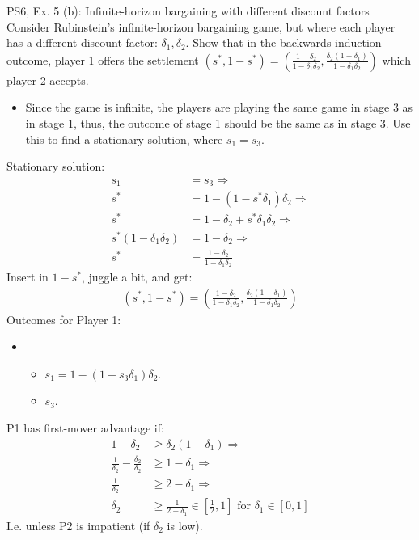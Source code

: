\begin{frame}{PS6, Ex. 5 (b): Infinite-horizon bargaining with different discount factors}
    Consider Rubinstein's infinite-horizon bargaining game, but where each player has a different discount factor: $\delta_1,\delta_2$. Show that in the backwards induction outcome, player 1 offers the settlement
    $(s^{*},1-s^{*})=\left( \frac{1-\delta_2}{1-\delta_1\delta_2},\frac{\delta_2(1-\delta_1)}{1-\delta_1\delta_2}\right)$
    which player 2 accepts.
    \begin{itemize}
      \item[(Step b)] Since the game is infinite, the players are playing the same game in stage 3 as in stage 1, thus, the outcome of stage 1 should be the same as in stage 3. Use this to find a stationary solution, where $s_{1}=s_{3}$.
    \end{itemize}
  \begin{multicols}{2}
    Stationary solution:
    \begin{align*}
          s_1&= s_3 \Rightarrow\\
        s^{*}&= 1- (1-s^{*}\delta_1)\delta_2 \Rightarrow\\
        s^{*}&= 1-\delta_2+s^{*}\delta_1\delta_2 \Rightarrow\\
        s^{*}(1-\delta_1\delta_2)&= 1-\delta_2 \Rightarrow\\
        s^{*}&= \frac{1-\delta_2}{1-\delta_1\delta_2}
    \end{align*}
    Insert in $1-s^{*}$, juggle a bit, and get:
    \begin{align*}
        (s^{*},1-s^{*})= \left( \frac{1-\delta_2}{1-\delta_1\delta_2},\frac{\delta_2(1-\delta_1)}{1-\delta_1\delta_2}\right)
    \end{align*}
    \vfill\null \columnbreak
    Outcomes for Player 1:
    \begin{itemize}
        \item[]\vspace{-8pt}
            \begin{itemize}\normalsize
            \item[Stage 1:] $s_1 = 1-(1-s_3\delta_1)\delta_2$.
            \item[Stage 3:] $s_3$.
            \end{itemize}
    \end{itemize}
    P1 has first-mover advantage if:
    \begin{align*}
      1-\delta_2&\geq\delta_2(1-\delta_1)\Rightarrow\\
      \frac{1}{\delta_2}-\frac{\delta_2}{\delta_2}&\geq1-\delta_1\Rightarrow\\
      \frac{1}{\delta_2}&\geq2-\delta_1\Rightarrow\\
      \delta_2&\geq\frac{1}{2-\delta_1}\in\left[\frac{1}{2},1\right]\text{ for }\delta_1\in[0,1]
    \end{align*}
    I.e. unless P2 is impatient (if $\delta_2$ is low).
    \vfill\null
  \end{multicols}
    \vfill\null
\end{frame}



